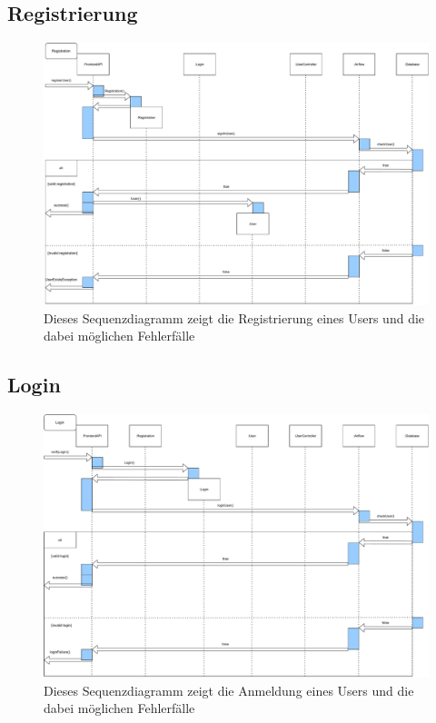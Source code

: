 \subsection{Registrierung}
\begin{figure}[H]
	\centering
	\includegraphics[width=\textwidth]{res/RegistrationSequence.pdf} 
	\caption{Dieses Sequenzdiagramm zeigt die Registrierung eines Users und die dabei möglichen Fehlerfälle}
\end{figure}
\subsection{Login}
\begin{figure}[H]
	\centering
	\includegraphics[width=\textwidth]{res/LoginSequence.pdf} 
	\caption{Dieses Sequenzdiagramm zeigt die Anmeldung eines Users und die dabei möglichen Fehlerfälle}
\end{figure}
